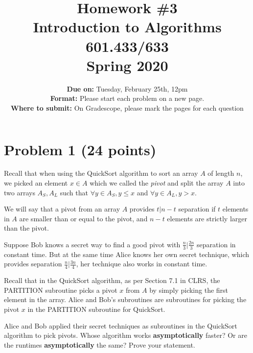 \documentclass[letterpaper, 11pt]{article}
\begin{document}
\title{Homework \#3 \\ Introduction to Algorithms \\ 601.433/633 \\ Spring 2020}
\author{\textbf{Due on:} Tuesday, February 25th, 12pm \\
\textbf{Format:} Please start each problem on a new page.
\\\textbf{Where to submit:} On Gradescope, please mark the pages for each question
\\}
\date{}
\vspace{-0.5cm}
\maketitle

\section{Problem 1 (24 points)}
Recall that when using the QuickSort algorithm to sort an array $A$ of length $n$, we picked an element $x \in A$ which we called the \emph{pivot} and split the array $A$ into two arrays $A_S, A_L$ such that $\forall y \in A_S, y \leq x$ and $\forall y \in A_L, y > x$. 

We will say that a pivot from an array $A$ provides $t|n-t$ separation if $t$ elements in $A$ are smaller than or equal to the pivot, and $n-t$ elements are strictly larger than the pivot.

Suppose Bob knows a secret way to find a good pivot with $\frac{n}{3} | \frac{2n}{3}$ separation in constant time. But at the same time Alice knows her own secret technique, which provides separation $\frac{n}{4} | \frac{3n}{4}$, her technique also works in constant time.

Recall that in the QuickSort algorithm, as per Section 7.1 in CLRS, the PARTITION subroutine picks a pivot $x$ from $A$ by simply picking the first element in the array. Alice and Bob's subroutines are subroutines for picking the pivot $x$ in the PARTITION subroutine for QuickSort. 

Alice and Bob applied their secret techniques as subroutines in the QuickSort algorithm to pick pivots. Whose algorithm works \textbf{asymptotically} faster? Or are the runtimes \textbf{asymptotically} the same? Prove your statement.
\end{document}
